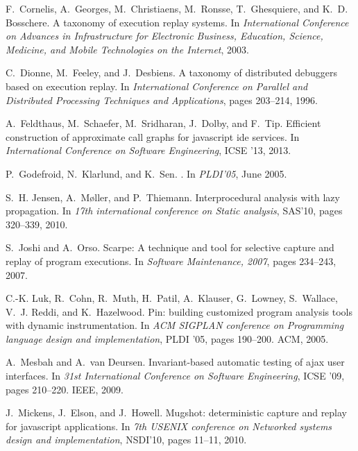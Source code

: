 \documentclass{sig-alternate}
\begin{document}
{\begin{thebibliography}{10}
F.~Cornelis, A.~Georges, M.~Christiaens, M.~Ronsse, T.~Ghesquiere, and K.~D.
  Bosschere.
\newblock A taxonomy of execution replay systems.
\newblock In {\em International Conference on Advances in Infrastructure for
  Electronic Business, Education, Science, Medicine, and Mobile Technologies on
  the Internet}, 2003.

C.~Dionne, M.~Feeley, and J.~Desbiens.
\newblock A taxonomy of distributed debuggers based on execution replay.
\newblock In {\em International Conference on Parallel and Distributed
  Processing Techniques and Applications}, pages 203--214, 1996.

A.~Feldthaus, M.~Schaefer, M.~Sridharan, J.~Dolby, and F.~Tip.
\newblock Efficient construction of approximate call graphs for javascript ide
  services.
\newblock In {\em International Conference on Software Engineering}, ICSE '13,
  2013.

P.~Godefroid, N.~Klarlund, and K.~Sen.
.
\newblock In {\em PLDI'05}, June 2005.

S.~H. Jensen, A.~M{\o}ller, and P.~Thiemann.
\newblock Interprocedural analysis with lazy propagation.
\newblock In {\em 17th international conference on Static analysis}, SAS'10,
  pages 320--339, 2010.

S.~Joshi and A.~Orso.
\newblock Scarpe: A technique and tool for selective capture and replay of
  program executions.
\newblock In {\em Software Maintenance, 2007}, pages 234--243, 2007.

C.-K. Luk, R.~Cohn, R.~Muth, H.~Patil, A.~Klauser, G.~Lowney, S.~Wallace, V.~J.
  Reddi, and K.~Hazelwood.
\newblock Pin: building customized program analysis tools with dynamic
  instrumentation.
\newblock In {\em ACM SIGPLAN conference on Programming language design and
  implementation}, PLDI '05, pages 190--200. ACM, 2005.

A.~Mesbah and A.~van Deursen.
\newblock Invariant-based automatic testing of ajax user interfaces.
\newblock In {\em 31st International Conference on Software Engineering}, ICSE
  '09, pages 210--220. IEEE, 2009.

J.~Mickens, J.~Elson, and J.~Howell.
\newblock Mugshot: deterministic capture and replay for javascript
  applications.
\newblock In {\em 7th USENIX conference on Networked systems design and
  implementation}, NSDI'10, pages 11--11, 2010.


\end{thebibliography}}
\end{document}
